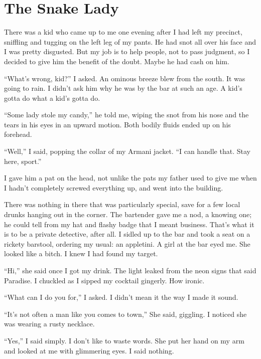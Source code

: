 \chapter{The Snake Lady}


There was a kid who came up to me one evening after I had left my
precinct, sniffling and tugging on the left leg of my pants. He had
snot all over his face and I was pretty disgusted. But my job is to
help people, not to pass judgment, so I decided to give him the
benefit of the doubt. Maybe he had cash on him.

``What's wrong, kid?'' I asked. An ominous breeze
blew from the south. It was going to rain. I didn't ask him
why he was by the bar at such an age. A kid's gotta do what a
kid's gotta do.

``Some lady stole my candy,'' he told me, wiping the snot
from his nose and the tears in his eyes in an upward motion. Both
bodily fluids ended up on his forehead.

``Well,'' I said, popping the collar of my Armani jacket.
``I can handle that. Stay here, sport.''

I gave him a pat on the head, not unlike the pats my father used to
give me when I hadn't completely screwed everything up, and
went into the building.



There was nothing in there that was particularly special, save for
a few local drunks hanging out in the corner. The bartender gave me
a nod, a knowing one; he could tell from my hat and flashy badge
that I meant business. That's what it is to be a private
detective, after all. I sidled up to the bar and took a seat on a
rickety barstool, ordering my usual: an appletini. A girl at the
bar eyed me. She looked like a bitch. I knew I had found my
target.



``Hi,'' she said once I got my drink. The light leaked
from the neon signs that said {\sc Paradise}. I chuckled as
I sipped my cocktail gingerly. How ironic.

``What can I do you for,'' I asked. I didn't mean
it the way I made it sound.

``It's not often a man like you comes to town,''
She said, giggling. I noticed she was wearing a rusty
necklace.

``Yes,'' I said simply. I don't like to waste
words. She put her hand on my arm and looked at me with glimmering
eyes. I said nothing.

